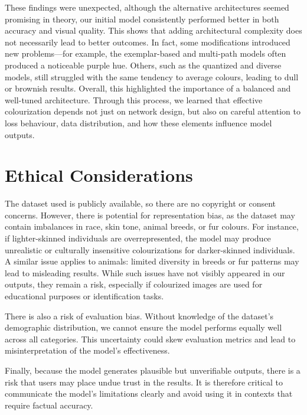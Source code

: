 \documentclass{article} %
\begin{document}
These findings were unexpected, although the alternative architectures seemed promising in theory, our initial model consistently performed better in both accuracy and visual quality. 
This shows that adding architectural complexity does not necessarily lead to better outcomes. In fact, some modifications introduced new problems—for example, the exemplar-based and 
multi-path models often produced a noticeable purple hue. Others, such as the quantized and diverse models, still struggled with the same tendency to average colours, leading to dull 
or brownish results. Overall, this highlighted the importance of a balanced and well-tuned architecture. Through this process, we learned that effective colourization depends not just 
on network design, but also on careful attention to loss behaviour, data distribution, and how these elements influence model outputs.

\section{Ethical Considerations}
\label{ethical}

The dataset used is publicly available, so there are no copyright or consent concerns. However, there is potential for representation bias, as the dataset may contain imbalances
in race, skin tone, animal breeds, or fur colours. For instance, if lighter-skinned individuals are overrepresented, the model may produce unrealistic or culturally insensitive colourizations 
for darker-skinned individuals. A similar issue applies to animals: limited diversity in breeds or fur patterns may lead to misleading results. While such issues have not visibly appeared in 
our outputs, they remain a risk, especially if colourized images are used for educational purposes or identification tasks.

There is also a risk of evaluation bias. Without knowledge of the dataset's demographic distribution, we cannot ensure the model performs equally well across all categories. This 
uncertainty could skew evaluation metrics and lead to misinterpretation of the model's effectiveness.

Finally, because the model generates plausible but unverifiable outputs, there is a risk that users may place undue trust in the results. It is therefore critical to communicate the model's 
limitations clearly and avoid using it in contexts that require factual accuracy.

\label{last_page}

\newpage


\end{document}
